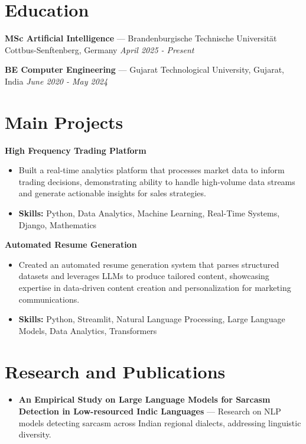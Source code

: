 \documentclass[a4paper,10pt]{article}
\begin{document}
\section*{Education}
\textbf{MSc Artificial Intelligence} — Brandenburgische Technische Universität Cottbus-Senftenberg, Germany \hfill \textit{April 2025 - Present}\par
\vspace{1.5pt}
\textbf{BE Computer Engineering} — Gujarat Technological University, Gujarat, India \hfill \textit{June 2020 - May 2024}\par

\section*{Main Projects}
\textbf{High Frequency Trading Platform}\par
\vspace{1pt}
\begin{itemize}
  \item Built a real-time analytics platform that processes market data to inform trading decisions, demonstrating ability to handle high-volume data streams and generate actionable insights for sales strategies.
  \item \textbf{Skills:} Python, Data Analytics, Machine Learning, Real-Time Systems, Django, Mathematics
\end{itemize}
\vspace{3pt}
\textbf{Automated Resume Generation}\par
\vspace{1pt}
\begin{itemize}
  \item Created an automated resume generation system that parses structured datasets and leverages LLMs to produce tailored content, showcasing expertise in data-driven content creation and personalization for marketing communications.
  \item \textbf{Skills:} Python, Streamlit, Natural Language Processing, Large Language Models, Data Analytics, Transformers
\end{itemize}

\section*{Research and Publications}
\begin{itemize}
\item \textbf{An Empirical Study on Large Language Models for Sarcasm Detection in Low-resourced Indic Languages} — Research on NLP models detecting sarcasm across Indian regional dialects, addressing linguistic diversity.
\end{itemize}
\end{document}
